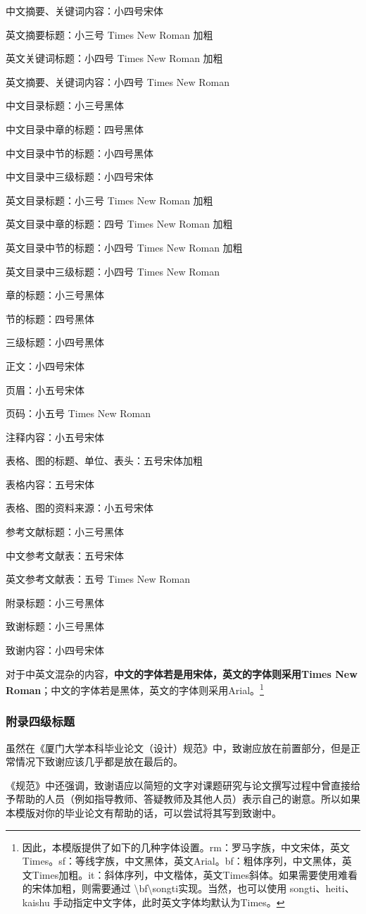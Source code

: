 \documentclass{xmu}
\begin{document}
\begin{appendix}
    中文摘要、关键词内容：小四号宋体\par
    英文摘要标题：小三号 Times New Roman 加粗\par
    英文关键词标题：小四号 Times New Roman 加粗\par
    英文摘要、关键词内容：小四号 Times New Roman\par
    中文目录标题：小三号黑体\par
    中文目录中章的标题：四号黑体\par
    中文目录中节的标题：小四号黑体\par
    中文目录中三级标题：小四号宋体\par
    英文目录标题：小三号 Times New Roman 加粗\par
    英文目录中章的标题：四号 Times New Roman 加粗\par
    英文目录中节的标题：小四号 Times New Roman 加粗\par
    英文目录中三级标题：小四号 Times New Roman\par
    章的标题：小三号黑体\par
    节的标题：四号黑体\par
    三级标题：小四号黑体\par
    正文：小四号宋体\par
    页眉：小五号宋体\par
    页码：小五号 Times New Roman\par
    注释内容：小五号宋体\par
    表格、图的标题、单位、表头：五号宋体加粗\par
    表格内容：五号宋体\par
    表格、图的资料来源：小五号宋体\par
    参考文献标题：小三号黑体\par
    中文参考文献表：五号宋体\par
    英文参考文献表：五号 Times New Roman\par
    附录标题：小三号黑体\par
    致谢标题：小三号黑体\par
    致谢内容：小四号宋体\par
    对于中英文混杂的内容，{\bf\songti 中文的字体若是用宋体，英文的字体则采用Times New Roman}；{\sf 中文的字体若是黑体，英文的字体则采用Arial}。\footnote{
        因此，本模版提供了如下的几种字体设置。rm：罗马字族，中文宋体，英文Times。sf：等线字族，中文黑体，英文Arial。bf：粗体序列，中文黑体，英文Times加粗。it：斜体序列，中文楷体，英文Times斜体。如果需要使用难看的宋体加粗，则需要通过 \textbackslash bf\textbackslash songti实现。当然，也可以使用 songti、heiti、kaishu 手动指定中文字体，此时英文字体均默认为Times。
    }
    \subsubsection{附录四级标题}
\end{appendix}


\begin{acknowledgement}
    虽然在《厦门大学本科毕业论文（设计）规范》中，致谢应放在前置部分，但是正常情况下致谢应该几乎都是放在最后的。
    \par
    《规范》中还强调，致谢语应以简短的文字对课题研究与论文撰写过程中曾直接给予帮助的人员（例如指导教师、答疑教师及其他人员）表示自己的谢意。所以如果本模版对你的毕业论文有帮助的话，可以尝试将其写到致谢中。
\end{acknowledgement}
\end{document}
